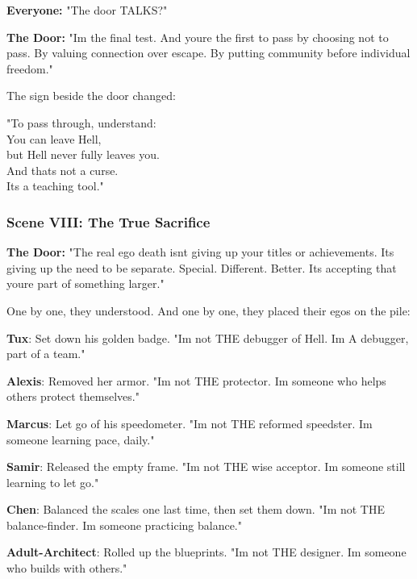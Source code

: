 \textbf{Everyone:} "The door TALKS?"

\textbf{The Door:} "I\textquotesingle m the final test. And you\textquotesingle re the first to pass by choosing not to pass. By valuing connection over escape. By putting community before individual freedom."

The sign beside the door changed:

"To pass through, understand:\\
You can leave Hell,\\
but Hell never fully leaves you.\\
And that\textquotesingle s not a curse.\\
It\textquotesingle s a teaching tool."

\bookdivider

\subsubsection{Scene VIII: The True Sacrifice}\label{scene-viii-the-true-sacrifice}

\textbf{The Door:} "The real ego death isn\textquotesingle t giving up your titles or achievements. It\textquotesingle s giving up the need to be separate. Special. Different. Better. It\textquotesingle s accepting that you\textquotesingle re part of something larger."

One by one, they understood. And one by one, they placed their egos on the pile:

\textbf{Tux}: Set down his golden badge. "I\textquotesingle m not THE debugger of Hell. I\textquotesingle m A debugger, part of a team."

\textbf{Alexis}: Removed her armor. "I\textquotesingle m not THE protector. I\textquotesingle m someone who helps others protect themselves."

\textbf{Marcus}: Let go of his speedometer. "I\textquotesingle m not THE reformed speedster. I\textquotesingle m someone learning pace, daily."

\textbf{Samir}: Released the empty frame. "I\textquotesingle m not THE wise acceptor. I\textquotesingle m someone still learning to let go."

\textbf{Chen}: Balanced the scales one last time, then set them down. "I\textquotesingle m not THE balance-finder. I\textquotesingle m someone practicing balance."

\textbf{Adult-Architect}: Rolled up the blueprints. "I\textquotesingle m not THE designer. I\textquotesingle m someone who builds with others."


